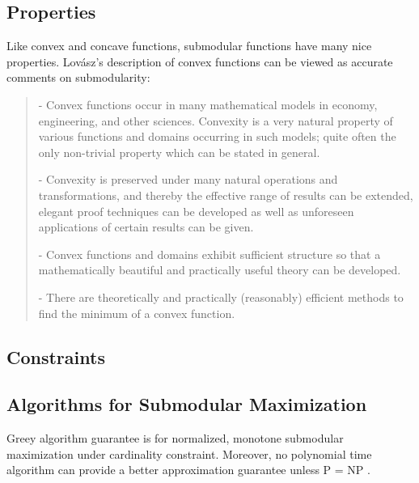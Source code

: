 \subsection{Properties}
Like convex and concave functions, submodular functions have many nice properties. Lov{\'a}sz's description of convex functions \cite{L83} can be viewed as accurate comments on submodularity:
\begin{quote}
 - Convex functions occur in many mathematical models in economy,
engineering, and other sciences. Convexity is a very natural property
of various functions and domains occurring in such models; quite
often the only non-trivial property which can be stated in general.

- Convexity is preserved under many natural operations and
transformations, and thereby the effective range of results can be
extended, elegant proof techniques can be developed as well as
unforeseen applications of certain results can be given.

- Convex functions and domains exhibit sufficient structure so that a
mathematically beautiful and practically useful theory can be
developed.

- There are theoretically and practically (reasonably) efficient methods
to find the minimum of a convex function.
\end{quote}
 


\subsection{Constraints}

\subsection{Algorithms for Submodular Maximization}
Greey algorithm guarantee is for normalized, monotone submodular maximization under cardinality constraint.  
Moreover, no polynomial time algorithm can provide a better approximation guarantee unless P = NP \cite{F98}.








